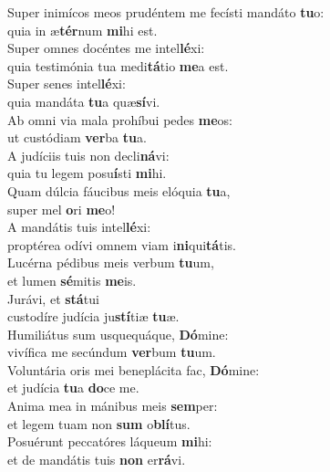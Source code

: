 \evenverse Super inimícos meos prudéntem me fecísti mandáto \textbf{tu}o:~\*\\
\evenverse quia in æ\textbf{tér}num \textbf{mi}hi est.\\
\oddverse Super omnes docéntes me intel\textbf{lé}xi:~\*\\
\oddverse quia testimónia tua medi\textbf{tá}tio \textbf{me}a est.\\
\evenverse Super senes intel\textbf{lé}xi:~\*\\
\evenverse quia mandáta \textbf{tu}a quæ\textbf{sí}vi.\\
\oddverse Ab omni via mala prohíbui pedes \textbf{me}os:~\*\\
\oddverse ut custódiam \textbf{ver}ba \textbf{tu}a.\\
\evenverse A judíciis tuis non decli\textbf{ná}vi:~\*\\
\evenverse quia tu legem posu\textbf{í}sti \textbf{mi}hi.\\
\oddverse Quam dúlcia fáucibus meis elóquia \textbf{tu}a,~\*\\
\oddverse super mel \textbf{o}ri \textbf{me}o!\\
\evenverse A mandátis tuis intel\textbf{lé}xi:~\*\\
\evenverse proptérea odívi omnem viam i\textbf{ni}qui\textbf{tá}tis.\\
\oddverse Lucérna pédibus meis verbum \textbf{tu}um,~\*\\
\oddverse et lumen \textbf{sé}mitis \textbf{me}is.\\
\evenverse Jurávi, et \textbf{stá}tui~\*\\
\evenverse custodíre judícia ju\textbf{stí}tiæ \textbf{tu}æ.\\
\oddverse Humiliátus sum usquequáque, \textbf{Dó}mine:~\*\\
\oddverse vivífica me secúndum \textbf{ver}bum \textbf{tu}um.\\
\evenverse Voluntária oris mei beneplácita fac, \textbf{Dó}mine:~\*\\
\evenverse et judícia \textbf{tu}a \textbf{do}ce me.\\
\oddverse Anima mea in mánibus meis \textbf{sem}per:~\*\\
\oddverse et legem tuam non \textbf{sum} o\textbf{blí}tus.\\
\evenverse Posuérunt peccatóres láqueum \textbf{mi}hi:~\*\\
\evenverse et de mandátis tuis \textbf{non} er\textbf{rá}vi.\\

